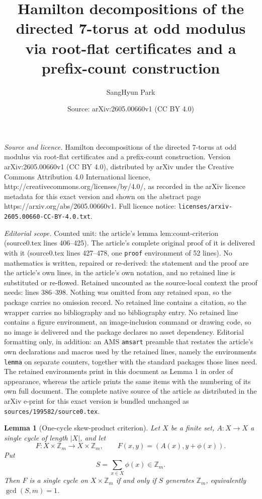 \documentclass[10pt,a4paper]{amsart}
\title{Hamilton decompositions of the directed 7-torus at odd modulus via root-flat certificates and a prefix-count construction}
\author{SangHyun Park}
\date{Source: arXiv:2605.00660v1 (CC BY 4.0)}
\newtheorem{lemma}{Lemma}
\begin{document}
\maketitle

\noindent\emph{Source and licence.} Hamilton decompositions of the directed 7-torus at odd modulus via root-flat certificates and a prefix-count construction. Version arXiv:2605.00660v1 (CC BY 4.0), distributed by arXiv under the Creative Commons Attribution 4.0 International licence, http://creativecommons.org/licenses/by/4.0/, as recorded in the arXiv licence metadata for this exact version and shown on the abstract page https://arxiv.org/abs/2605.00660v1. Full licence notice: \texttt{licenses/arxiv-2605.00660-CC-BY-4.0.txt}.\par\smallskip

\noindent\textit{Editorial scope.} Counted unit: the article's lemma lem:count-criterion (source0.tex lines 406--425). The article's complete original proof of it is delivered with it (source0.tex lines 427--478, one \texttt{proof} environment of 52 lines). No mathematics is written, repaired or re-derived: the statement and the proof are the article's own lines, in the article's own notation, and no retained line is substituted or re-flowed.  Retained uncounted as the source-local context the proof needs: lines 386--398.  Nothing was omitted from any retained span, so the package carries no omission record.  No retained line contains a citation, so the wrapper carries no bibliography and no bibliography entry.  No retained line contains a figure environment, an image-inclusion command or drawing code, so no image is delivered and the package declares no asset dependency.  Editorial formatting only, in addition: an AMS \texttt{amsart} preamble that restates the article's own declarations and macros used by the retained lines, namely the environments \texttt{lemma} on separate counters, together with the standard packages those lines need.  The retained environments print in this document as Lemma 1 in order of appearance, whereas the article prints the same items with the numbering of its own full document.  The complete native source of the article as distributed in the arXiv e-print for this exact version is bundled unchanged as \texttt{sources/199582/source0.tex}.
\begin{lemma}[One-cycle skew-product criterion]\label{lem:skew-product}
Let \(X\) be a finite set, \(A:X\to X\) a single cycle of length \(|X|\), and let
\[
F:X\times\mathbb Z_m\to X\times\mathbb Z_m,
\qquad F(x,y)=(A(x),y+\phi(x)).
\]
Put
\[
S=\sum_{x\in X}\phi(x)\in\mathbb Z_m.
\]
Then \(F\) is a single cycle on \(X\times\mathbb Z_m\) if and only if \(S\) generates
\(\mathbb Z_m\), equivalently \(\gcd(S,m)=1\).
\end{lemma}
\end{document}
